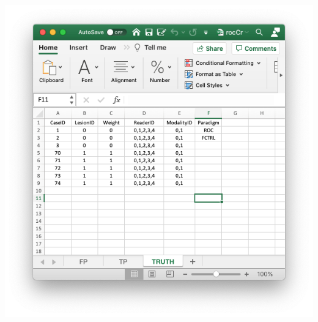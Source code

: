 \documentclass[
]{book}
\begin{document}
\includegraphics[width=1\textwidth,height=\textheight]{images/quick-start/rocCrTruth.png}
\end{document}
